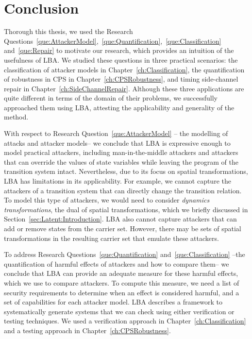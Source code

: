 \chapter{Conclusion}
Thorough this thesis, we used the Research Questions~\ref{que:AttackerModel},~\ref{que:Quantification},~\ref{que:Classification} and~\ref{que:Repair} to motivate our research, which provides an intuition of the usefulness of LBA. We studied these questions in three practical scenarios: the classification of attacker models in Chapter~\ref{ch:Classification}, the quantification of robustness in CPS in Chapter~\ref{ch:CPSRobustness}, and timing side-channel repair in Chapter~\ref{ch:SideChannelRepair}. Although these three applications are quite different in terms of the domain of their problems, we successfully approached them using LBA, attesting the applicability and generality of the method. 

With respect to Research Question~\ref{que:AttackerModel} -- the modelling of attacks and attacker models-- we conclude that LBA is expressive enough to model practical attackers, including man-in-the-middle attackers and attackers that can override the values of state variables while leaving the program of the transition system intact. Nevertheless, due to its focus on spatial transformations, LBA has limitations in its applicability. For example, we cannot capture the attackers of a transition system that can directly change the transition relation. To model this type of attackers, we would need to consider \emph{dynamics transformations}, the dual of spatial transformations, which we briefly discussed in Section~\ref{sec:Latent:Introduction}. LBA also cannot capture attackers that can add or remove states from the carrier set. However, there may be sets of spatial transformations in the resulting carrier set that emulate these attackers. 

To address Research Questions~\ref{que:Quantification} and~\ref{que:Classification} --the quantification of harmful effects of attackers and how to compare them-- we conclude that LBA can provide an adequate measure for these harmful effects, which we use to compare attackers. To compute this measure, we need a list of security requirements to determine when an effect is considered harmful, and a set of capabilities for each attacker model. LBA describes a framework to systematically generate systems that we can check using either verification or testing techniques. We used a verification approach in Chapter~\ref{ch:Classification} and a testing approach in Chapter~\ref{ch:CPSRobustness}. 

